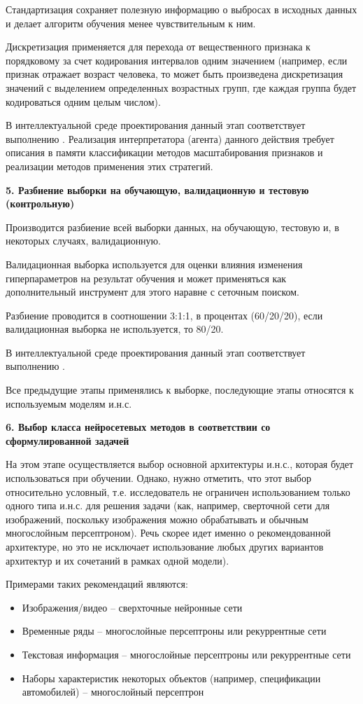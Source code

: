 Стандартизация сохраняет полезную информацию о выбросах в исходных данных и делает алгоритм обучения менее чувствительным к ним.

Дискретизация применяется для перехода от вещественного признака к порядковому за счет кодирования интервалов одним значением (например, если признак отражает возраст человека, то может быть произведена дискретизация значений с выделением определенных возрастных групп, где каждая группа будет кодироваться одним целым числом).

В интеллектуальной среде проектирования данный этап соответствует выполнению . Реализация интерпретатора (агента) данного действия требует описания в памяти классификации методов масштабирования признаков и реализации методов применения этих стратегий.


\textbf{5. Разбиение выборки на обучающую, валидационную и тестовую (контрольную)}

Производится разбиение всей выборки данных, на обучающую, тестовую и, в некоторых случаях, валидационную.

Валидационная выборка используется для оценки влияния изменения гиперпараметров на результат обучения и может применяться как дополнительный инструмент для этого наравне с сеточным поиском.

Разбиение проводится в соотношении 3:1:1, в процентах (60/20/20), если валидационная выборка не используется, то 80/20.

В интеллектуальной среде проектирования данный этап соответствует выполнению .

Все предыдущие этапы применялись к выборке, последующие этапы относятся к используемым моделям и.н.с.


\textbf{6. Выбор класса нейросетевых методов в соответствии со сформулированной задачей}

На этом этапе осуществляется выбор основной архитектуры и.н.с., которая будет использоваться при обучении. Однако, нужно отметить, что этот выбор относительно условный, т.е. исследователь не ограничен использованием только одного типа и.н.с. для решения задачи (как, например, сверточной сети для изображений, поскольку изображения можно обрабатывать и обычным многослойным персептроном). Речь скорее идет именно о рекомендованной архитектуре, но это не исключает использование любых других вариантов архитектур и их сочетаний в рамках одной модели).

Примерами таких рекомендаций являются:
\begin{itemize}
	\item Изображения/видео -- сверхточные нейронные сети
	\item Временные ряды -- многослойные персептроны или рекуррентные сети
	\item Текстовая информация -- многослойные персептроны или рекуррентные сети
	\item Наборы характеристик некоторых объектов (например, спецификации автомобилей) -- многослойный персептрон
\end{itemize}

